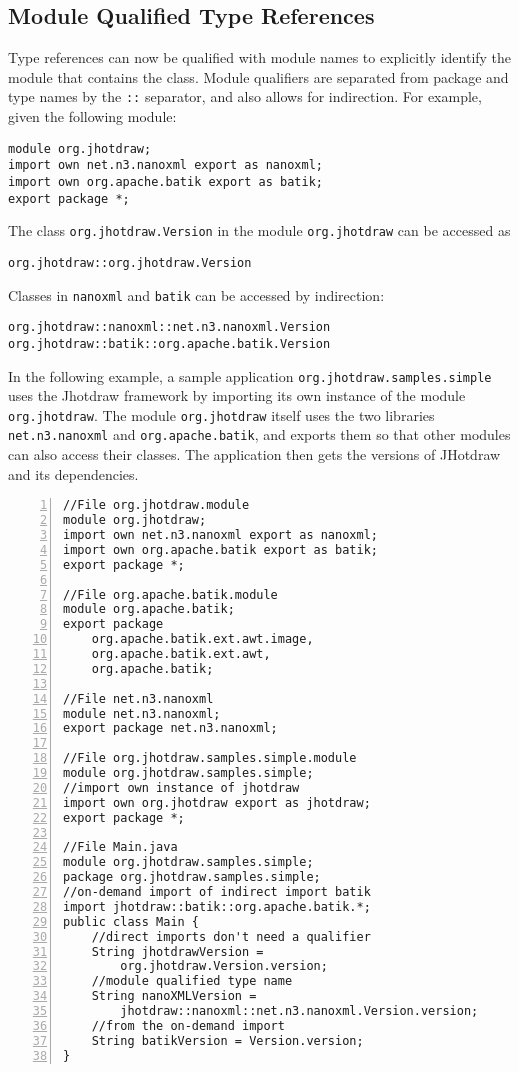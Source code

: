 \subsection{Module Qualified Type References}

Type references can now be qualified with module names to explicitly
identify the module that contains the class. Module qualifiers
are separated from package and type names by the \texttt{::} separator,
and also allows for indirection. For example, given the following module:

\begin{lstlisting}
module org.jhotdraw;
import own net.n3.nanoxml export as nanoxml;
import own org.apache.batik export as batik;
export package *;
\end{lstlisting}

The class \texttt{org.jhotdraw.Version} in the module \texttt{org.jhotdraw}
can be accessed as
\begin{lstlisting}
org.jhotdraw::org.jhotdraw.Version
\end{lstlisting}
Classes in \texttt{nanoxml} and \texttt{batik} can be accessed by indirection:
\begin{lstlisting}
org.jhotdraw::nanoxml::net.n3.nanoxml.Version
org.jhotdraw::batik::org.apache.batik.Version
\end{lstlisting}

In the following example, a sample application \texttt{org.jhotdraw.samples.simple}
uses the Jhotdraw framework by importing its own instance of the module
\texttt{org.jhotdraw}. The module \texttt{org.jhotdraw} itself uses the 
two libraries \texttt{net.n3.nanoxml} and \texttt{org.apache.batik}, and
exports them so that other modules can also access their classes. The 
application then gets the versions of JHotdraw and its dependencies.

\begin{lstlisting}[caption=Module Qualified Type References,numbers=left]
//File org.jhotdraw.module
module org.jhotdraw;
import own net.n3.nanoxml export as nanoxml;
import own org.apache.batik export as batik;
export package *;

//File org.apache.batik.module
module org.apache.batik;
export package 
	org.apache.batik.ext.awt.image,
	org.apache.batik.ext.awt,
	org.apache.batik;

//File net.n3.nanoxml
module net.n3.nanoxml;
export package net.n3.nanoxml;

//File org.jhotdraw.samples.simple.module
module org.jhotdraw.samples.simple;
//import own instance of jhotdraw
import own org.jhotdraw export as jhotdraw;
export package *;

//File Main.java
module org.jhotdraw.samples.simple;
package org.jhotdraw.samples.simple;
//on-demand import of indirect import batik
import jhotdraw::batik::org.apache.batik.*;
public class Main {
	//direct imports don't need a qualifier
	String jhotdrawVersion = 
		org.jhotdraw.Version.version;
	//module qualified type name
	String nanoXMLVersion = 
		jhotdraw::nanoxml::net.n3.nanoxml.Version.version;
	//from the on-demand import
	String batikVersion = Version.version;
}
\end{lstlisting}

